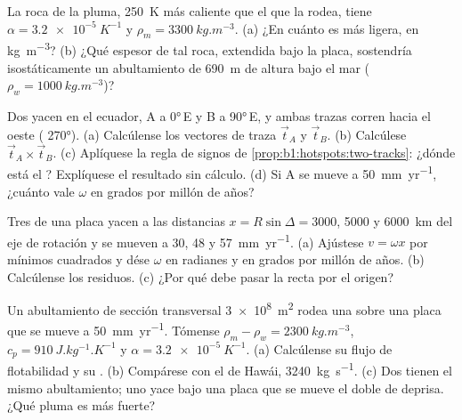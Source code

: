 \begin{exercise}[$\star$]\label{exo:b1:hotspots:4}
La roca de la pluma, \qty{250}{K} más caliente que el  que la rodea, tiene $\alpha = \qty{3.2e-5}{K^{-1}}$ y $\rho_m = \qty{3300}{kg.m^{-3}}$.
(a) ¿En cuánto es más ligera, en \unit{kg.m^{-3}}? (b) ¿Qué espesor de tal roca, extendida bajo la placa, sostendría isostáticamente un abultamiento
de \qty{690}{m} de altura bajo el mar ($\rho_w = \qty{1000}{kg.m^{-3}}$)?
\end{exercise}

\begin{exercise}[$\star\star$]\label{exo:b1:hotspots:5}
Dos  yacen en el ecuador, A a \ang{0}\,E y B a \ang{90}\,E, y ambas trazas corren hacia el oeste ( \ang{270}). (a) Calcúlense los
vectores de traza $\vec t_A$ y $\vec t_B$. (b) Calcúlese $\vec t_A\times\vec t_B$. (c) Aplíquese la regla de signos de \cref{prop:b1:hotspots:two-tracks}:
¿dónde está el ? Explíquese el resultado sin cálculo. (d) Si A se mueve a \qty{50}{mm.yr^{-1}}, ¿cuánto vale $\omega$ en grados por millón de años?
\end{exercise}

\begin{exercise}[$\star\star$]\label{exo:b1:hotspots:6}
Tres  de una placa yacen a las distancias $x = R\sin\Delta = 3000$, 5000 y \qty{6000}{km} del eje de rotación y se mueven a 30, 48 y
\qty{57}{mm.yr^{-1}}. (a) Ajústese $v = \omega x$ por mínimos cuadrados y dése $\omega$ en radianes y en grados por millón de años. (b) Calcúlense los
residuos. (c) ¿Por qué debe pasar la recta por el origen?
\end{exercise}

\begin{exercise}[$\star\star$]\label{exo:b1:hotspots:7}
Un abultamiento de sección transversal \qty{3e8}{m^2} rodea una  sobre una placa que se mueve a \qty{50}{mm.yr^{-1}}. Tómense
$\rho_m - \rho_w = \qty{2300}{kg.m^{-3}}$, $c_p = \qty{910}{J.kg^{-1}.K^{-1}}$ y $\alpha = \qty{3.2e-5}{K^{-1}}$. (a) Calcúlense su flujo de flotabilidad y
su . (b) Compárese con el de Hawái, \qty{3240}{kg.s^{-1}}. (c) Dos  tienen el mismo abultamiento; uno yace bajo una placa
que se mueve el doble de deprisa. ¿Qué pluma es más fuerte?
\end{exercise}


